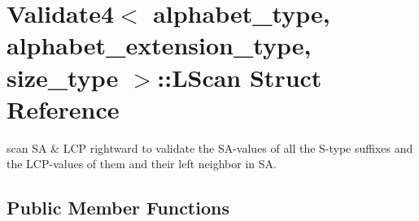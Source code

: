 \hypertarget{struct_validate4_1_1_l_scan}{}\section{Validate4$<$ alphabet\+\_\+type, alphabet\+\_\+extension\+\_\+type, size\+\_\+type $>$\+:\+:L\+Scan Struct Reference}
\label{struct_validate4_1_1_l_scan}


scan SA \& L\+CP rightward to validate the S\+A-\/values of all the S-\/type suffixes and the L\+C\+P-\/values of them and their left neighbor in SA.  


\subsection*{Public Member Functions}
